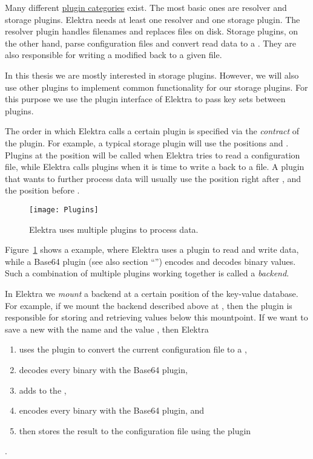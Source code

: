 Many different \href{https://www.libelektra.org/plugins}{plugin categories} exist. The most basic ones are resolver and storage plugins. Elektra needs at least one resolver and one storage plugin. The resolver plugin handles filenames and replaces files on disk. Storage plugins, on the other hand, parse configuration files and convert read data to a . They are also responsible for writing a modified  back to a given file.

In this thesis we are mostly interested in storage plugins. However, we will also use other plugins to implement common functionality for our  storage plugins. For this purpose we use the plugin interface of Elektra to pass key sets between plugins.

The order in which Elektra calls a certain plugin is specified via the \emph{contract} of the plugin. For example, a typical storage plugin will use the positions  and . Plugins at the position  will be called when Elektra tries to read a configuration file, while Elektra calls  plugins when it is time to write a  back to a file. A plugin that wants to further process data will usually use the position  right after , and  the position before .

\begin{figure}
  \centering
    \texttt{[image: Plugins]}
  \caption{Elektra uses multiple plugins to process data.}
  \label{fig:plugins}
\end{figure}

Figure~\ref{fig:plugins} shows a example, where Elektra uses a  plugin to read and write data, while a Base64 plugin (see also section “”) encodes and decodes binary values. Such a combination of multiple plugins working together is called a \emph{backend}.

In Elektra we \emph{mount} a backend at a certain position of the key-value database. For example, if we mount the backend described above at , then the  plugin is responsible for storing and retrieving values below this mountpoint. If we want to save a new  with the name  and the value , then Elektra

\begin{enumerate}
  \item uses the  plugin to convert the current  configuration file to a ,
  \item decodes every binary  with the Base64 plugin,
  \item adds  to the ,
  \item encodes every binary  with the Base64 plugin, and
  \item then stores the result to the configuration file using the  plugin
\end{enumerate}

.
